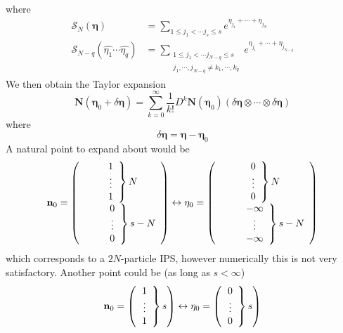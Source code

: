 \documentclass[aps,preprint]{revtex4}%
\begin{document}
where
\begin{align}
\mathcal{S}_{N}\left(  \mathbf{\eta}\right)   &  =\sum_{1\leq j_{1}<\cdots
j_{s}\leq s}e^{\eta_{j_{1}}+\cdots+\eta_{j_{N}}}\\
\mathcal{S}_{N-q}\left(  \widehat{\eta_{1}}\cdots\widehat{\eta_{q}}\right)
&  =\sum_{\substack{1\leq j_{1}<\cdots j_{N-q}\leq s\\j_{1},\cdots,j_{N-q}\neq
k_{1},\cdots,k_{q}}}e^{\eta_{j_{1}}+\cdots+\eta_{j_{N-q}}}%
\end{align}
We then obtain the Taylor expansion
\begin{equation}
\mathbf{N}\left(  \mathbf{\eta}_{0}+\delta\mathbf{\eta}\right)  =\sum
_{k=0}^{\infty}\frac{1}{k!}D^{k}\mathbf{N}\left(  \mathbf{\eta}_{0}\right)
\left(  \delta\mathbf{\eta}\otimes\cdots\otimes\delta\mathbf{\eta}\right)
\end{equation}
where
\begin{equation}
\delta\mathbf{\eta}=\mathbf{\eta}-\mathbf{\eta}_{0}%
\end{equation}
A natural point to expand about would be
\begin{equation}
\mathbf{n}_{0}=\left(
\begin{array}
[c]{c}%
\left.
\begin{array}
[c]{c}%
1\\
\vdots\\
1
\end{array}
\right\}  N\\
\qquad\left.
\begin{array}
[c]{c}%
0\\
\vdots\\
0
\end{array}
\right\}  s-N
\end{array}
\right)  \leftrightarrow\mathbf{\eta}_{0}=\left(
\begin{array}
[c]{c}%
\left.
\begin{array}
[c]{c}%
0\\
\vdots\\
0
\end{array}
\right\}  N\\
\qquad\left.
\begin{array}
[c]{c}%
-\infty\\
\vdots\\
-\infty
\end{array}
\right\}  s-N
\end{array}
\right)
\end{equation}
which corresponds to a $2N$-particle IPS, however numerically this is not very
satisfactory. Another point could be (as long as $s<\infty$)
\begin{equation}
\mathbf{n}_{0}=\left(  \left.
\begin{array}
[c]{c}%
1\\
\vdots\\
1
\end{array}
\right\}  s\right)  \leftrightarrow\mathbf{\eta}_{0}=\left(  \left.
\begin{array}
[c]{c}%
0\\
\vdots\\
0
\end{array}
\right\}  s\right)
\end{equation}
\end{document}
